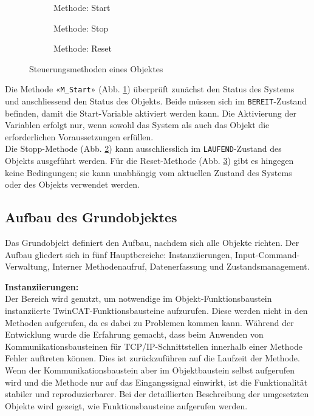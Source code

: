 		\begin{figure}[h!]
			\centering
			\begin{subfigure}[b]{0.4\textwidth}
				\centering
				\caption{Methode: Start}
				\label{fig:Objekt_MStart}
			\end{subfigure}
			\hfill
			\begin{subfigure}[b]{0.3\textwidth}
				\centering
				\caption{Methode: Stop}
				\label{fig:Objekt_MStop}
			\end{subfigure}
			\hfill
			\begin{subfigure}[b]{0.2\textwidth}
				\centering
				\caption{Methode: Reset}
				\label{fig:Objekt_MReset}
			\end{subfigure}
			\caption{Steuerungsmethoden eines Objektes}
			\label{fig:Steuerungsmethoden_Objekt}
		\end{figure} 
		
		Die Methode «\verb|M_Start|» (Abb. \ref{fig:Objekt_MStart}) überprüft zunächst den Status des Systems und anschliessend den Status des Objekts. Beide müssen sich im \verb|BEREIT|-Zustand befinden, damit die Start-Variable aktiviert werden kann. Die Aktivierung der Variablen erfolgt nur, wenn sowohl das System als auch das Objekt die erforderlichen Voraussetzungen erfüllen.
		\\
		Die Stopp-Methode (Abb. \ref{fig:Objekt_MStop}) kann ausschliesslich im \verb|LAUFEND|-Zustand des Objekts ausgeführt werden. Für die Reset-Methode (Abb. \ref{fig:Objekt_MReset}) gibt es hingegen keine Bedingungen; sie kann unabhängig vom aktuellen Zustand des Systems oder des Objekts verwendet werden.
		
		\newpage
		
	\subsection{Aufbau des Grundobjektes} \label{Grundobjekt_Aufbau}
		Das Grundobjekt definiert den Aufbau, nachdem sich alle Objekte richten. Der Aufbau gliedert sich in fünf Hauptbereiche: Instanziierungen, Input-Command-Verwaltung, Interner Methodenaufruf, Datenerfassung und Zustandsmanagement.  
		
		\textbf{Instanziierungen:}
		\vspace{2mm} 
		\\
		Der Bereich wird genutzt, um notwendige im Objekt-Funktionsbaustein instanziierte TwinCAT-Funktionsbausteine aufzurufen. Diese werden nicht in den Methoden aufgerufen, da es dabei zu Problemen kommen kann. Während der Entwicklung wurde die Erfahrung gemacht, dass beim Anwenden von Kommunikationsbausteinen für TCP/IP-Schnittstellen innerhalb einer Methode Fehler auftreten können. Dies ist zurückzuführen auf die Laufzeit der Methode. Wenn der Kommunikationsbaustein aber im Objektbaustein selbst aufgerufen wird und die Methode nur auf das Eingangssignal einwirkt, ist die Funktionalität stabiler und reproduzierbarer. Bei der detaillierten Beschreibung der umgesetzten Objekte wird gezeigt, wie Funktionsbausteine aufgerufen werden. 
		
